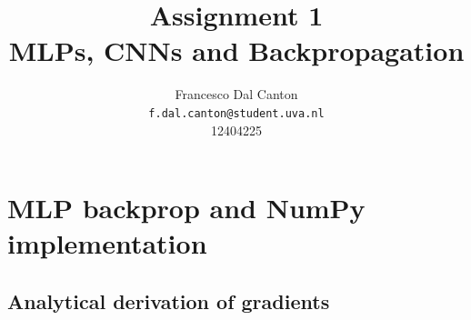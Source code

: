 \documentclass{article}
\title{Assignment 1\\MLPs, CNNs and Backpropagation}
\author{%
  Francesco Dal Canton \\
  \texttt{f.dal.canton@student.uva.nl} \\
  12404225
}
\begin{document}
\maketitle

\section{MLP backprop and NumPy implementation}

\subsection{Analytical derivation of gradients}

\subsubsection{}
\end{document}

